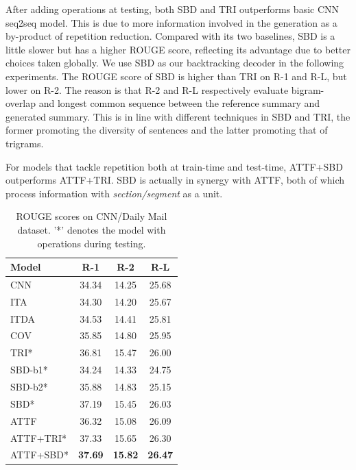 After adding operations at testing, 
both SBD and TRI outperforms basic CNN seq2seq model. 
This is due to more information involved in the generation 
as a by-product of repetition reduction.
Compared with its two baselines, SBD is a little slower 
but has a higher ROUGE score, reflecting its advantage due to
better choices taken globally.
We use SBD as our backtracking decoder in the following experiments. 
The ROUGE score of SBD is higher than TRI on R-1 and R-L, but lower on R-2. 
The reason is that R-2 and R-L respectively evaluate
bigram-overlap and longest common sequence between the reference
summary and generated summary. This is in line with different techniques 
in SBD and TRI, the former promoting the diversity of sentences and 
the latter promoting that of trigrams.

For models that tackle repetition both at train-time and test-time, 
ATTF+SBD outperforms ATTF+TRI.
SBD is actually in synergy with ATTF, both of which process 
information with \textit{section/segment} as a unit.

\begin{table}[th]
	\centering
	\scriptsize
	\begin{tabular}{|l|c|c|c|}
		\hline
		Model &   R-1 & R-2 & R-L \\
		\hline
		CNN &  34.34 & 14.25 & 25.68 \\
		ITA &  34.30 & 14.20 & 25.67 \\
		ITDA & 34.53 & 14.41 &  25.81 \\
	    COV	& 35.85 & 14.80 &  25.95 \\
        TRI* & 36.81 & 15.47 & 26.00 \\
		\hline
		SBD-b1* & 34.24 & 14.33 & 24.75 \\
		SBD-b2* & 35.88 & 14.83 & 25.15 \\
		SBD* & 37.19 & 15.45 & 26.03 \\
		ATTF & 36.32 & 15.08 & 26.09 \\
		ATTF+TRI* & 37.33 & 15.65 & 26.30 \\
		ATTF+SBD* & \bf 37.69 & \bf 15.82 & \bf 26.47 \\
		\hline
	\end{tabular}
	\caption{ROUGE scores on CNN/Daily Mail dataset. '*' denotes the model with operations during testing.}
	\label{tab:eval_main}
\end{table}

